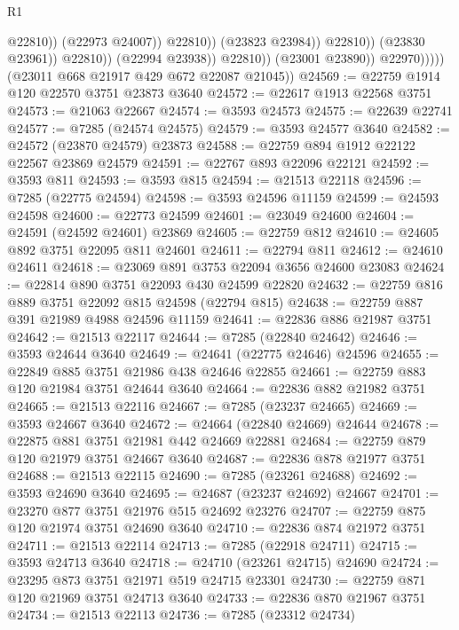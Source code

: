 \begin{lexlean}{R1}
\begin{coremodule}
                                              @22810))
                                          (@22973 @24007))
                                        @22810))
                                    (@23823 @23984))
                                  @22810))
                              (@23830 @23961))
                            @22810))
                        (@22994 @23938))
                      @22810))
                  (@23001 @23890))
                @22970)))))
      (@23011 @668 @21917 @429 @672 @22087 @21045))
@24569 := @22759 @1914 @120 @22570 @3751 @23873 @3640
@24572 := @22617 @1913 @22568 @3751
@24573 := @21063 @22667
@24574 := @3593 @24573
@24575 := @22639 @22741
@24577 := @7285 (@24574 @24575)
@24579 := @3593 @24577 @3640
@24582 := @24572 (@23870 @24579) @23873
@24588 := @22759 @894 @1912 @22122 @22567 @23869 @24579
@24591 := @22767 @893 @22096 @22121
@24592 := @3593 @811
@24593 := @3593 @815
@24594 := @21513 @22118
@24596 := @7285 (@22775 @24594)
@24598 := @3593 @24596 @11159
@24599 := @24593 @24598
@24600 := @22773 @24599
@24601 := @23049 @24600
@24604 := @24591 (@24592 @24601) @23869
@24605 := @22759 @812
@24610 := @24605 @892 @3751 @22095 @811 @24601
@24611 := @22794 @811
@24612 := @24610 @24611
@24618 := @23069 @891 @3753 @22094 @3656 @24600 @23083
@24624 := @22814 @890 @3751 @22093 @430 @24599 @22820
@24632 := @22759 @816 @889 @3751 @22092 @815 @24598 (@22794 @815)
@24638 := @22759 @887 @391 @21989 @4988 @24596 @11159
@24641 := @22836 @886 @21987 @3751
@24642 := @21513 @22117
@24644 := @7285 (@22840 @24642)
@24646 := @3593 @24644 @3640
@24649 := @24641 (@22775 @24646) @24596
@24655 := @22849 @885 @3751 @21986 @438 @24646 @22855
@24661 := @22759 @883 @120 @21984 @3751 @24644 @3640
@24664 := @22836 @882 @21982 @3751
@24665 := @21513 @22116
@24667 := @7285 (@23237 @24665)
@24669 := @3593 @24667 @3640
@24672 := @24664 (@22840 @24669) @24644
@24678 := @22875 @881 @3751 @21981 @442 @24669 @22881
@24684 := @22759 @879 @120 @21979 @3751 @24667 @3640
@24687 := @22836 @878 @21977 @3751
@24688 := @21513 @22115
@24690 := @7285 (@23261 @24688)
@24692 := @3593 @24690 @3640
@24695 := @24687 (@23237 @24692) @24667
@24701 := @23270 @877 @3751 @21976 @515 @24692 @23276
@24707 := @22759 @875 @120 @21974 @3751 @24690 @3640
@24710 := @22836 @874 @21972 @3751
@24711 := @21513 @22114
@24713 := @7285 (@22918 @24711)
@24715 := @3593 @24713 @3640
@24718 := @24710 (@23261 @24715) @24690
@24724 := @23295 @873 @3751 @21971 @519 @24715 @23301
@24730 := @22759 @871 @120 @21969 @3751 @24713 @3640
@24733 := @22836 @870 @21967 @3751
@24734 := @21513 @22113
@24736 := @7285 (@23312 @24734)

\end{coremodule}
\end{lexlean}
